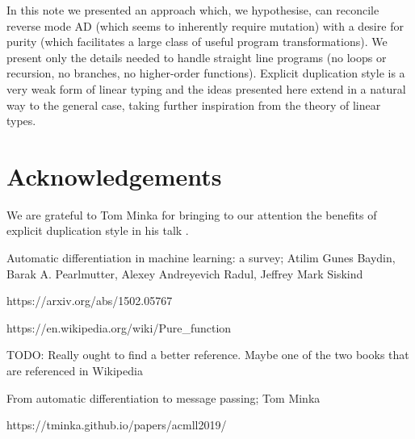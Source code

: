 \documentclass[12pt]{article}
\begin{document}
In this note we presented an approach which, we hypothesise, can
reconcile reverse mode AD (which seems to inherently require mutation)
with a desire for purity (which facilitates a large class of useful
program transformations).  We present only the details needed to
handle straight line programs (no loops or recursion, no branches, no
higher-order functions).  Explicit duplication style is a very weak
form of linear typing and the ideas presented here extend in a natural
way to the general case, taking further inspiration from the theory of
linear types.






\section{Acknowledgements}

We are grateful to Tom Minka for bringing to our attention the
benefits of explicit duplication style in his talk \cite{minka}.

\begin{thebibliography}{9}

  Automatic differentiation in machine learning: a survey;
  Atilim Gunes Baydin, Barak A. Pearlmutter, Alexey Andreyevich Radul, Jeffrey Mark Siskind
  
https://arxiv.org/abs/1502.05767
  
  https://en.wikipedia.org/wiki/Pure\_function

  TODO: Really ought to find a better reference.  Maybe one of the two
  books that are referenced in Wikipedia

  From automatic differentiation to message passing; Tom Minka

  https://tminka.github.io/papers/acmll2019/

\end{thebibliography}
\end{document}
